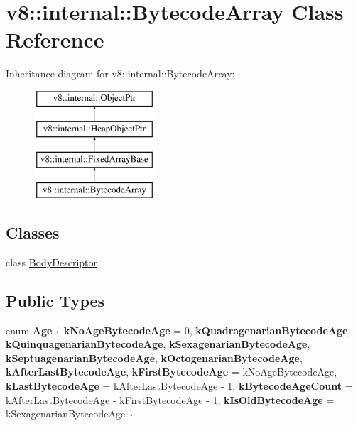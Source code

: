 \hypertarget{classv8_1_1internal_1_1BytecodeArray}{}\section{v8\+:\+:internal\+:\+:Bytecode\+Array Class Reference}
\label{classv8_1_1internal_1_1BytecodeArray}
Inheritance diagram for v8\+:\+:internal\+:\+:Bytecode\+Array\+:\begin{figure}[H]
\begin{center}
\leavevmode
\includegraphics[height=4.000000cm]{classv8_1_1internal_1_1BytecodeArray}
\end{center}
\end{figure}
\subsection*{Classes}
\begin{DoxyCompactItemize}
\item 
class \mbox{\hyperlink{classv8_1_1internal_1_1BytecodeArray_1_1BodyDescriptor}{Body\+Descriptor}}
\end{DoxyCompactItemize}
\subsection*{Public Types}
\begin{DoxyCompactItemize}
\item 
\mbox{\label{classv8_1_1internal_1_1BytecodeArray_aad9666f0919bbeea3f4f8a065efa14d9}} 
enum {\bfseries Age} \{ \newline
{\bfseries k\+No\+Age\+Bytecode\+Age} = 0, 
{\bfseries k\+Quadragenarian\+Bytecode\+Age}, 
{\bfseries k\+Quinquagenarian\+Bytecode\+Age}, 
{\bfseries k\+Sexagenarian\+Bytecode\+Age}, 
\newline
{\bfseries k\+Septuagenarian\+Bytecode\+Age}, 
{\bfseries k\+Octogenarian\+Bytecode\+Age}, 
{\bfseries k\+After\+Last\+Bytecode\+Age}, 
{\bfseries k\+First\+Bytecode\+Age} = k\+No\+Age\+Bytecode\+Age, 
\newline
{\bfseries k\+Last\+Bytecode\+Age} = k\+After\+Last\+Bytecode\+Age -\/ 1, 
{\bfseries k\+Bytecode\+Age\+Count} = k\+After\+Last\+Bytecode\+Age -\/ k\+First\+Bytecode\+Age -\/ 1, 
{\bfseries k\+Is\+Old\+Bytecode\+Age} = k\+Sexagenarian\+Bytecode\+Age
 \}
\end{DoxyCompactItemize}
